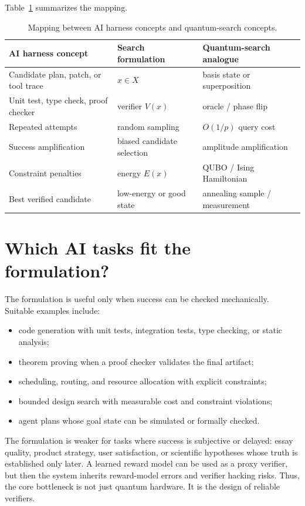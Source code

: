 \documentclass[11pt]{article}
\begin{document}
Table~\ref{tab:mapping} summarizes the mapping.

\begin{table}[t]
\centering
\caption{Mapping between AI harness concepts and quantum-search concepts.}
\label{tab:mapping}
\begin{tabular}{lll}
\toprule
AI harness concept & Search formulation & Quantum-search analogue \\
\midrule
Candidate plan, patch, or tool trace & $x\in X$ & basis state or superposition \\
Unit test, type check, proof checker & verifier $V(x)$ & oracle / phase flip \\
Repeated attempts & random sampling & $O(1/p)$ query cost \\
Success amplification & biased candidate selection & amplitude amplification \\
Constraint penalties & energy $E(x)$ & QUBO / Ising Hamiltonian \\
Best verified candidate & low-energy or good state & annealing sample / measurement \\
\bottomrule
\end{tabular}
\end{table}

\section{Which AI tasks fit the formulation?}

The formulation is useful only when success can be checked mechanically. Suitable examples include:
\begin{itemize}
  \item code generation with unit tests, integration tests, type checking, or static analysis;
  \item theorem proving when a proof checker validates the final artifact;
  \item scheduling, routing, and resource allocation with explicit constraints;
  \item bounded design search with measurable cost and constraint violations;
  \item agent plans whose goal state can be simulated or formally checked.
\end{itemize}

The formulation is weaker for tasks where success is subjective or delayed: essay quality, product strategy, user satisfaction, or scientific hypotheses whose truth is established only later. A learned reward model can be used as a proxy verifier, but then the system inherits reward-model errors and verifier hacking risks. Thus, the core bottleneck is not just quantum hardware. It is the design of reliable verifiers.
\end{document}
